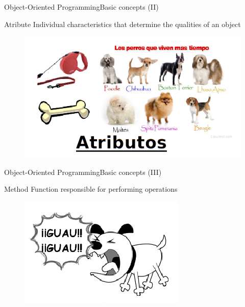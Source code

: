\documentclass[10pt,compress]{beamer} %
\begin{document}
\begin{frame}{Object-Oriented Programming}{Basic concepts (II)}
	\vfill\begin{block}{Atribute}
		Individual characteristics that determine the qualities of an object
  	\end{block}	
		\begin{figure}
			\includegraphics[scale=0.5]{figs/atributo}
		\end{figure}				
\end{frame}

\begin{frame}{Object-Oriented Programming}{Basic concepts (III)}
	\vfill\begin{block}{Method}
		 Function responsible for performing operations
  	\end{block}	
		\begin{figure}
			\includegraphics[scale=0.5]{figs/metodo}
		\end{figure}				
\end{frame}
\end{document}
